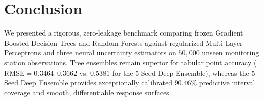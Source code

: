 \documentclass[journal,10pt,twocolumn]{IEEEtran}
\begin{document}
\section{Conclusion}
We presented a rigorous, zero-leakage benchmark comparing frozen Gradient Boosted Decision Trees and Random Forests against regularized Multi-Layer Perceptrons and three neural uncertainty estimators on $50,000$ unseen monitoring station observations. Tree ensembles remain superior for tabular point accuracy ($\text{RMSE} = 0.3464\text{--}0.3662$ vs. $0.5381$ for the 5-Seed Deep Ensemble), whereas the 5-Seed Deep Ensemble provides exceptionally calibrated $90.46\%$ predictive interval coverage and smooth, differentiable response surfaces.

\balance


\end{document}

